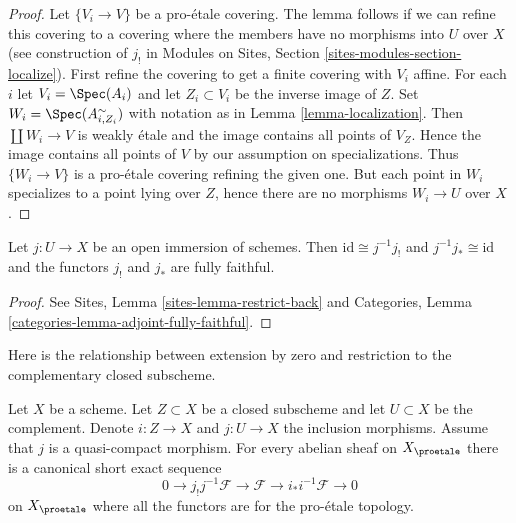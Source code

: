 \begin{proof}
Let $\{V_i \to V\}$ be a pro-\'etale covering. The lemma follows if we
can refine this covering to a covering where the members have no
morphisms into $U$ over $X$ (see construction of $j_!$ in
Modules on Sites, Section \ref{sites-modules-section-localize}).
First refine the covering to get a finite covering with $V_i$ affine.
For each $i$ let $V_i = \Spec(A_i)$ and let $Z_i \subset V_i$ be the
inverse image of $Z$.
Set $W_i = \Spec(A_{i, Z_i}^\sim)$ with notation as in
Lemma \ref{lemma-localization}.
Then $\coprod W_i \to V$ is weakly \'etale and the image contains all
points of $V_Z$. Hence the image contains all points of $V$ by
our assumption on specializations. Thus $\{W_i \to V\}$ is a
pro-\'etale covering refining the given one. But each point in $W_i$
specializes to a point lying over $Z$, hence there are no morphisms
$W_i \to U$ over $X$.
\end{proof}

\begin{lemma}
\label{lemma-open-immersion}
Let $j : U \to X$ be an open immersion of schemes.
Then $\text{id} \cong j^{-1}j_!$ and $j^{-1}j_* \cong \text{id}$
and the functors $j_!$ and $j_*$ are fully faithful.
\end{lemma}

\begin{proof}
See Sites, Lemma \ref{sites-lemma-restrict-back}
and
Categories, Lemma \ref{categories-lemma-adjoint-fully-faithful}.
\end{proof}

\noindent
Here is the relationship between extension by zero and restriction
to the complementary closed subscheme.

\begin{lemma}
\label{lemma-ses-associated-to-open}
Let $X$ be a scheme. Let $Z \subset X$ be a closed subscheme and let
$U \subset X$ be the complement. Denote $i : Z \to X$ and $j : U \to X$
the inclusion morphisms. Assume that $j$ is a quasi-compact morphism.
For every abelian sheaf on $X_\proetale$ there is a canonical short exact
sequence
$$
0 \to j_!j^{-1}\mathcal{F} \to \mathcal{F} \to i_*i^{-1}\mathcal{F} \to 0
$$
on $X_\proetale$ where all the functors are for the pro-\'etale topology.
\end{lemma}

